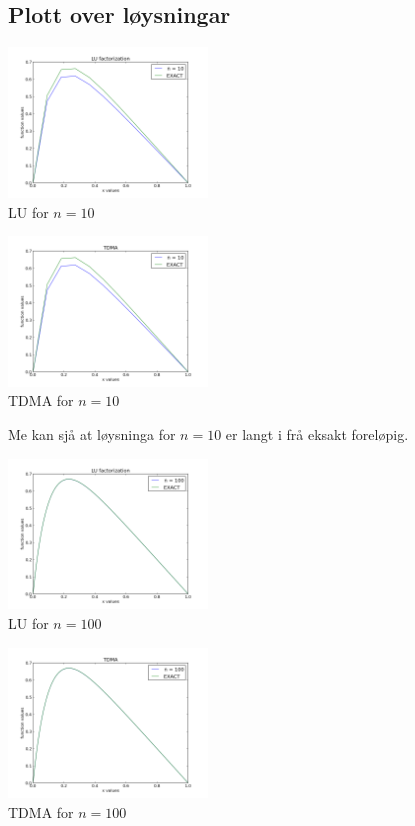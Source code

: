 \documentclass[11pt, a4paper]{article}
\begin{document}
  \subsection{Plott over løysningar}

    \begin{center}
      \includegraphics[width=200px]{LU10.png} \\
      \caption{LU for $n = 10$}
    \end{center}
    \begin{center}
      \includegraphics[width=200px]{TDMA10.png} \\
      \caption{TDMA for $n = 10$}
    \end{center}

    Me kan sjå at løysninga for $n = 10$ er langt i frå eksakt foreløpig.

    \begin{center}
      \includegraphics[width=200px]{LU100.png} \\
      \caption{LU for $n = 100$}
    \end{center}
    \begin{center}
      \includegraphics[width=200px]{TDMA100.png} \\
      \caption{TDMA for $n = 100$}
    \end{center}
\end{document}
